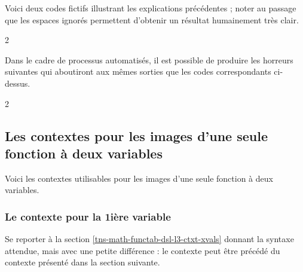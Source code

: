 \documentclass[10pt, a4paper]{article}
\begin{document}


Voici deux codes fictifs illustrant les explications précédentes ; noter au passage que les espaces ignorés permettent d'obtenir un résultat humainement très clair.
\begin{multicols}{2}

\end{multicols}

Dans le cadre de processus automatisés, il est possible de produire les horreurs suivantes qui aboutiront aux mêmes sorties que les codes correspondants ci-dessus.
\begin{multicols}{2}

\end{multicols}



\subsection{Les contextes pour les images d'une seule fonction à deux variables}

Voici les contextes utilisables pour les images d'une seule fonction à deux variables.

\medskip

\begin{itemize*}[before = \leavevmode\kern15pt, itemjoin = \kern15pt]
	\item {}

	\item {}

	\item {}
\end{itemize*}




\subsubsection{Le contexte  pour la 1ière variable}

Se reporter à la section \ref{tns-math-functab-dsl-l3-ctxt-xvals} donnant la syntaxe attendue, mais avec une petite différence : le contexte  peut être précédé du contexte  présenté dans la section suivante.
\end{document}
